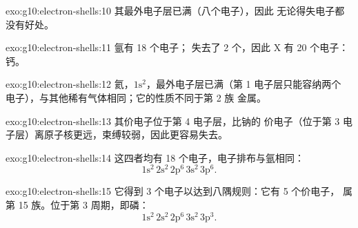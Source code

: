 \begin{solution}{exo:g10:electron-shells:10}
其最外电子层已满（八个电子），因此
无论得失电子都没有好处。
\end{solution}

\begin{solution}{exo:g10:electron-shells:11}
氩有 18 个电子； 失去了 2 个，因此 X 有 20 个电子：钙。
\end{solution}

\begin{solution}{exo:g10:electron-shells:12}
氦，$1\mathrm{s}^2$，最外电子层已满（第 1 电子层只能容纳两个
电子），与其他稀有气体相同；它的性质不同于第 2 族
金属。
\end{solution}

\begin{solution}{exo:g10:electron-shells:13}
其价电子位于第 4 电子层，比钠的
价电子（位于第 3 电子层）离原子核更远，束缚较弱，因此更容易失去。
\end{solution}

\begin{solution}{exo:g10:electron-shells:14}
这四者均有 18 个电子，电子排布与氩相同：
\[ 1\mathrm{s}^2\,2\mathrm{s}^2\,2\mathrm{p}^6\,3\mathrm{s}^2\,3\mathrm{p}^6. \]
\end{solution}

\begin{solution}{exo:g10:electron-shells:15}
它得到 3 个电子以达到八隅规则：它有 5 个价电子，
属第 15 族。位于第 3 周期，即磷：
\[ 1\mathrm{s}^2\,2\mathrm{s}^2\,2\mathrm{p}^6\,3\mathrm{s}^2\,3\mathrm{p}^3. \]
\end{solution}

